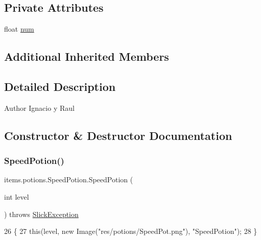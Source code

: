 \subsection*{Private Attributes}
\begin{DoxyCompactItemize}
\item 
float \mbox{\hyperlink{classitems_1_1potions_1_1_speed_potion_aea1ee6c20166ae724fc8218fc990d4f2}{num}}
\end{DoxyCompactItemize}
\subsection*{Additional Inherited Members}


\subsection{Detailed Description}
\begin{DoxyAuthor}{Author}
Ignacio y Raul 
\end{DoxyAuthor}


\subsection{Constructor \& Destructor Documentation}
\mbox{\label{classitems_1_1potions_1_1_speed_potion_a5d015761f8fd01edfd4779d532d1dcae}} 
\subsubsection{\texorpdfstring{Speed\+Potion()}{SpeedPotion()}\hspace{0.1cm}{\footnotesize\ttfamily [1/2]}}
{\footnotesize\ttfamily items.\+potions.\+Speed\+Potion.\+Speed\+Potion (\begin{DoxyParamCaption}\item[{int}]{level }\end{DoxyParamCaption}) throws \mbox{\hyperlink{classorg_1_1newdawn_1_1slick_1_1_slick_exception}{Slick\+Exception}}\hspace{0.3cm}{\ttfamily [inline]}}


\begin{DoxyCode}
26                                                         \{
27         \textcolor{keyword}{this}(level, \textcolor{keyword}{new} Image(\textcolor{stringliteral}{"res/potions/SpeedPot.png"}), \textcolor{stringliteral}{"SpeedPotion"});
28     \}
\end{DoxyCode}
\mbox{\label{classitems_1_1potions_1_1_speed_potion_a086bb833594251d682a31c2050598ba3}} 
